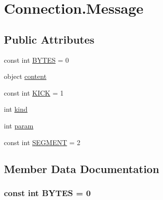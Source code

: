 \hypertarget{structOTA_1_1Sockets_1_1Connection_1_1Message}{}\section{Connection.\+Message}
\label{structOTA_1_1Sockets_1_1Connection_1_1Message}
\subsection*{Public Attributes}
\begin{DoxyCompactItemize}
\item 
const int \hyperlink{structOTA_1_1Sockets_1_1Connection_1_1Message_a2f7b420bd64592495a91b1cd4a44efd5}{B\+Y\+T\+E\+S} = 0
\item 
object \hyperlink{structOTA_1_1Sockets_1_1Connection_1_1Message_ae6e96a188b3ff2becebda9b51e318f8f}{content}
\item 
const int \hyperlink{structOTA_1_1Sockets_1_1Connection_1_1Message_a098e11ac5faaa4ae4b309b8a78d2a3c1}{K\+I\+C\+K} = 1
\item 
int \hyperlink{structOTA_1_1Sockets_1_1Connection_1_1Message_ab961f0bab26537f6671c9c1add6e6725}{kind}
\item 
int \hyperlink{structOTA_1_1Sockets_1_1Connection_1_1Message_a1a3bcdb98792a1ce2e9c403f4b10292a}{param}
\item 
const int \hyperlink{structOTA_1_1Sockets_1_1Connection_1_1Message_a065b15c143ddeb22ce42ab60c7021bee}{S\+E\+G\+M\+E\+N\+T} = 2
\end{DoxyCompactItemize}


\subsection{Member Data Documentation}
\hypertarget{structOTA_1_1Sockets_1_1Connection_1_1Message_a2f7b420bd64592495a91b1cd4a44efd5}{}
\subsubsection[{B\+Y\+T\+E\+S}]{\setlength{\rightskip}{0pt plus 5cm}const int B\+Y\+T\+E\+S = 0}\label{structOTA_1_1Sockets_1_1Connection_1_1Message_a2f7b420bd64592495a91b1cd4a44efd5}
\hypertarget{structOTA_1_1Sockets_1_1Connection_1_1Message_ae6e96a188b3ff2becebda9b51e318f8f}{}
